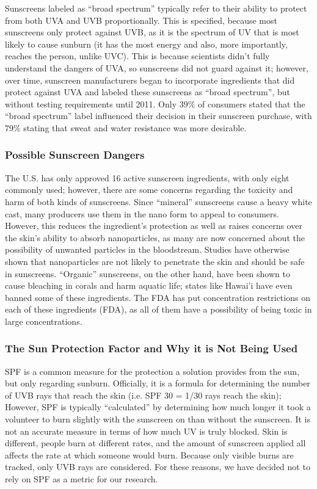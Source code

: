 \documentclass{article}
\begin{document}
Sunscreens labeled as “broad spectrum” typically refer to their ability to protect from both UVA and UVB proportionally. This is specified, because most sunscreens only protect against UVB, as it is the spectrum of UV that is most likely to cause sunburn (it has the most energy and also, more importantly, reaches the person, unlike UVC). This is because scientists didn’t fully understand the dangers of UVA, so sunscreens did not guard against it; however, over time, sunscreen manufacturers began to incorporate ingredients that did protect against UVA and labeled these sunscreens as “broad spectrum”, but without testing requirements until 2011. Only 39\% of consumers stated that the “broad spectrum” label influenced their decision in their sunscreen purchase, with 79\% stating that sweat and water resistance was more desirable. \cite{caribbean_sol_3_2022}

\subsubsection{Possible Sunscreen Dangers}
The U.S. has only approved 16 active sunscreen ingredients, with only eight commonly used; however, there are some concerns regarding the toxicity and harm of both kinds of sunscreens. Since “mineral” sunscreens cause a heavy white cast, many producers use them in the nano form to appeal to consumers. However, this reduces the ingredient’s protection as well as raises concerns over the skin's ability to absorb nanoparticles, as many are now concerned about the possibility of unwanted particles in the bloodstream. Studies have otherwise shown that nanoparticles are not likely to penetrate the skin and should be safe in sunscreens. \cite{mohammed_noninvasive_2020} “Organic” sunscreens, on the other hand, have been shown to cause bleaching in corals and harm aquatic life; states like Hawai’i have even banned some of these ingredients. The FDA has put concentration restrictions on each of these ingredients (FDA), as all of them have a possibility of being toxic in large concentrations.

\subsubsection{The Sun Protection Factor and Why it is Not Being Used}
SPF is a common measure for the protection a solution provides from the sun, but only regarding sunburn. Officially, it is a formula for determining the number of UVB rays that reach the skin (i.e. SPF 30 = 1/30 rays reach the skin); However, SPF is typically “calculated” by determining how much longer it took a volunteer to burn slightly with the sunscreen on than without the sunscreen. It is not an accurate measure in terms of how much UV is truly blocked. Skin is different, people burn at different rates, and the amount of sunscreen applied all affects the rate at which someone would burn. Because only visible burns are tracked, only UVB rays are considered. For these reasons, we have decided not to rely on SPF as a metric for our research.
\end{document}
